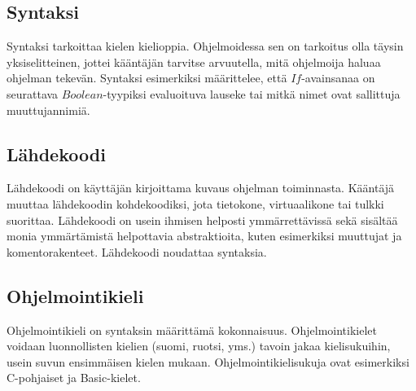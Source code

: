 \subsection{Syntaksi}
Syntaksi tarkoittaa kielen kielioppia.
Ohjelmoidessa sen on tarkoitus olla täysin yksiselitteinen,
jottei kääntäjän tarvitse arvuutella,
mitä ohjelmoija haluaa ohjelman tekevän.
Syntaksi esimerkiksi määrittelee,
että $If$-avainsanaa on seurattava $Boolean$-tyypiksi evaluoituva lauseke
tai mitkä nimet ovat sallittuja muuttujannimiä.

\subsection{Lähdekoodi}
Lähdekoodi on käyttäjän kirjoittama kuvaus ohjelman toiminnasta.
Kääntäjä muuttaa lähdekoodin kohdekoodiksi,
jota tietokone, virtuaalikone tai tulkki suorittaa.
Lähdekoodi on usein ihmisen helposti ymmärrettävissä
sekä sisältää monia ymmärtämistä helpottavia abstraktioita,
kuten esimerkiksi muuttujat ja komentorakenteet.
Lähdekoodi noudattaa syntaksia.

\subsection{Ohjelmointikieli}
Ohjelmointikieli on syntaksin määrittämä kokonnaisuus.
Ohjelmointikielet voidaan luonnollisten kielien
(suomi, ruotsi, yms.)
tavoin jakaa kielisukuihin,
usein suvun ensimmäisen kielen mukaan.
Ohjelmointikielisukuja ovat esimerkiksi
C-pohjaiset ja
Basic-kielet.
